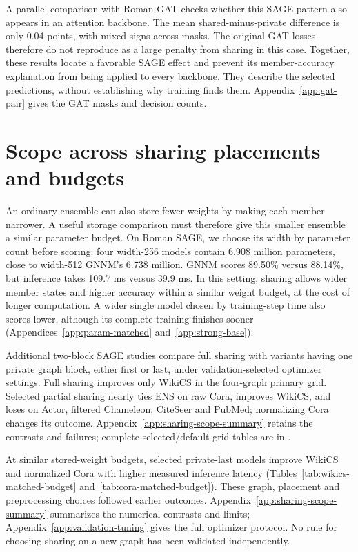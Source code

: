 \documentclass{article}
\begin{document}
A parallel comparison with Roman GAT checks whether this SAGE pattern also appears in an attention backbone. The mean shared-minus-private difference is only 0.04 points, with mixed signs across masks. The original GAT losses therefore do not reproduce as a large penalty from sharing in this case. Together, these results locate a favorable SAGE effect and prevent its member-accuracy explanation from being applied to every backbone. They describe the selected predictions, without establishing why training finds them. Appendix~\ref{app:gat-pair} gives the GAT masks and decision counts.





\section{Scope across sharing placements and budgets}\label{sec:additional}
An ordinary ensemble can also store fewer weights by making each member narrower. A useful storage comparison must therefore give this smaller ensemble a similar parameter budget. On Roman SAGE, we choose its width by parameter count before scoring: four width-256 models contain 6.908 million parameters, close to width-512 GNNM's 6.738 million. GNNM scores 89.50\% versus 88.14\%, but inference takes 109.7 ms versus 39.9 ms. In this setting, sharing allows wider member states and higher accuracy within a similar weight budget, at the cost of longer computation. A wider single model chosen by training-step time also scores lower, although its complete training finishes sooner (Appendices~\ref{app:param-matched} and~\ref{app:strong-base}).

Additional two-block SAGE studies compare full sharing with variants having one private graph block, either first or last, under validation-selected optimizer settings. Full sharing improves only WikiCS in the four-graph primary grid. Selected partial sharing nearly ties ENS on raw Cora, improves WikiCS, and loses on Actor, filtered Chameleon, CiteSeer and PubMed; normalizing Cora changes its outcome. Appendix~\ref{app:sharing-scope-summary} retains the contrasts and failures; complete selected/default grid tables are in .

At similar stored-weight budgets, selected private-last models improve WikiCS and normalized Cora with higher measured inference latency (Tables~\ref{tab:wikics-matched-budget} and~\ref{tab:cora-matched-budget}). These graph, placement and preprocessing choices followed earlier outcomes. Appendix~\ref{app:sharing-scope-summary} summarizes the numerical contrasts and limits; Appendix~\ref{app:validation-tuning} gives the full optimizer protocol. No rule for choosing sharing on a new graph has been validated independently.
\end{document}
